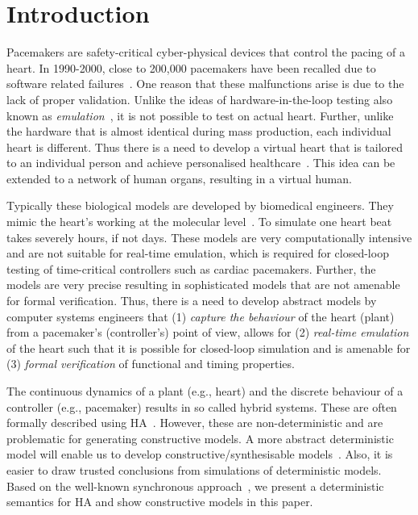 \section{Introduction}

Pacemakers are safety-critical cyber-physical devices 
that control the pacing of a heart.
In 1990-2000, close to 200,000 pacemakers have been recalled
due to software related failures~\cite{alemzadeh13}.
 One reason that these malfunctions
arise is due to the lack of proper validation.
Unlike the ideas of hardware-in-the-loop testing
  also known as \emph {emulation}~\cite{patel2015survey},
it is not possible to test on actual heart.
Further, unlike the hardware that is almost identical 
during mass production, each individual heart is different.
Thus there is a need to develop a virtual heart that is tailored
to an individual person and achieve
 personalised healthcare~\cite{Trayanova2014}. 
 This idea can be extended 
to a network of human organs, resulting in a virtual human.

Typically these biological  models are  developed by biomedical engineers.
They mimic the heart's working at the
molecular level~\cite{Trayanova2014}. 
To simulate one heart beat takes severely hours, if not days.
These models are very computationally intensive and 
are not suitable for real-time emulation,
which is required for closed-loop testing of time-critical 
controllers such as cardiac pacemakers.
Further, the models are 
 very precise resulting in sophisticated models that 
 are not amenable for  formal verification. 
Thus, there is a need to develop abstract models 
by computer systems engineers that  
(1)  \emph{capture the behaviour} of the heart (plant) 
from a pacemaker's (controller's) point of view,
allows for (2) \emph{real-time emulation} of the heart 
such that it is possible for closed-loop simulation and
is amenable for (3) \emph{formal verification} of 
functional and timing properties.


The continuous dynamics of a plant (e.g., heart) and
 the discrete behaviour of a controller (e.g., pacemaker) 
 results in so called hybrid systems. 
 These are often formally described using \acf{HA}~\cite{alur2015principles,raskin05,chen201487}.
 However, these are non-deterministic and are problematic
 for generating constructive models.
 A more abstract deterministic model will enable us to
 develop constructive/synthesisable models~\cite{Lee2014}. Also, 
 it is easier to draw trusted conclusions from simulations
 of deterministic models. Based on the
 well-known synchronous approach~\cite{benveniste03}, 
 we present a deterministic semantics for \ac{HA} and show
 constructive models in this paper.


